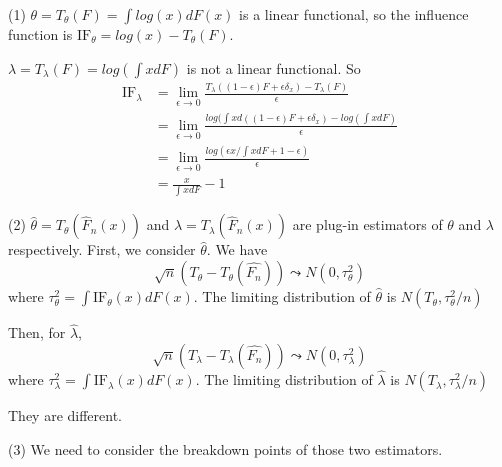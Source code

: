 \begin{solution}
    (1) $\theta = T_\theta(F) = \int log(x) d F(x)$ is a linear functional, so the influence function is $\text{IF}_\theta = log(x) - T_\theta(F)$.

    $\lambda = T_\lambda(F) = log(\int x dF)$ is not a linear functional. So 
    \begin{equation*}
        \begin{split}
            \text{IF}_\lambda & = \lim_{\epsilon\to0} \frac{T_\lambda((1-\epsilon)F + \epsilon \delta_x) - T_\lambda(F)}{\epsilon} \\
            & = \lim_{\epsilon\to0}  \frac{log(\int x d ((1-\epsilon)F + \epsilon \delta_x) - log(\int x dF)}{\epsilon} \\
            & = \lim_{\epsilon\to0}  \frac{log \left( \epsilon  x /\int x dF + 1-\epsilon \right)}{\epsilon} \\
            & = \frac{x}{\int x dF} - 1
        \end{split}
    \end{equation*}

    (2) $\hat{\theta} = T_\theta(\hat{F}_n(x))$ and $\hat{\lambda} = T_\lambda(\hat{F}_n(x))$ are plug-in estimators of $\theta$ and $\lambda$ respectively. 
    First, we consider $\hat{\theta}$. 
    We have
    \begin{equation*}
        \sqrt{n} (T_\theta - T_\theta(\hat{F_n})) \leadsto N(0, \tau_\theta^2)
    \end{equation*}
    where $\tau_\theta^2 = \int \text{IF}_\theta(x) d F(x)$. 
    The limiting distribution of $\hat{\theta}$ is $N(T_\theta, \tau_\theta^2/n)$

    Then, for $\hat{\lambda}$,
    \begin{equation*}
        \sqrt{n} (T_\lambda - T_\lambda(\hat{F_n})) \leadsto N(0, \tau_\lambda^2)
    \end{equation*}
    where $\tau_\lambda^2 = \int \text{IF}_\lambda(x) d F(x)$. 
    The limiting distribution of $\hat{\lambda}$ is $N(T_\lambda, \tau_\lambda^2/n)$
    
    They are different.

    (3) We need to consider the breakdown points of those two estimators.
    

\end{solution}

